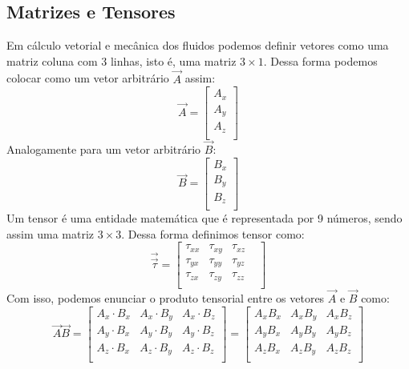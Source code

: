 \documentclass[12pt,a4paper]{article}
\begin{document}
\subsection{Matrizes e Tensores}
Em cálculo vetorial e mecânica dos fluidos podemos definir vetores como uma matriz coluna com 3 linhas, isto é, uma matriz $3 \times 1$. Dessa forma podemos colocar como um vetor arbitrário $\Vec{A}$ assim:
\begin{equation}
    \Vec{A} = \begin{bmatrix}
    A_{x}\\
    A_{y}\\
    A_{z}\\
    \end{bmatrix}
\end{equation}
Analogamente para um vetor arbitrário $\Vec{B}$:
\begin{equation}
    \Vec{B} = \begin{bmatrix}
    B_{x}\\
    B_{y}\\
    B_{z}\\
    \end{bmatrix}
\end{equation}
Um tensor é uma entidade matemática que é representada por 9 números, sendo assim uma matriz $3\times3$. Dessa forma definimos tensor como:
\begin{equation}
    \vec{\vec{\tau}} = \begin{bmatrix}
    \tau_{xx} & \tau_{xy} & \tau_{xz} & \\
    \tau_{yx} & \tau_{yy} & \tau_{yz} & \\
    \tau_{zx} & \tau_{zy} & \tau_{zz} & \\
    \end{bmatrix}
\end{equation}
Com isso, podemos enunciar o produto tensorial entre os vetores $\Vec{A}$ e $\Vec{B}$ como:
\begin{equation}
    \Vec{A}\Vec{B} = \begin{bmatrix}
    A_{x}\cdot B_{x} & A_{x}\cdot B_{y} & A_{x}\cdot B_{z}\\
    A_{y}\cdot B_{x} & A_{y}\cdot B_{y} & A_{y}\cdot B_{z} \\
    A_{z}\cdot B_{x} & A_{z}\cdot B_{y} & A_{z}\cdot B_{z} \\ 
    \end{bmatrix}
    = \begin{bmatrix}
    A_{x}B_{x} & A_{x}B_{y} & A_{x}B_{z}\\
    A_{y}B_{x} & A_{y}B_{y} & A_{y}B_{z}\\
    A_{z}B_{x} & A_{z}B_{y} & A_{z}B_{z}\\ 
    \end{bmatrix}
\end{equation}
\end{document}
